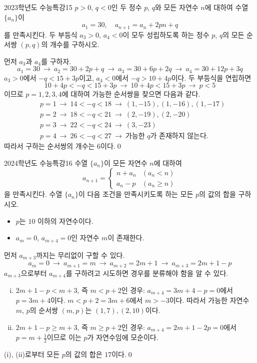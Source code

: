 \documentclass{article}
\begin{document}
\newpage
\begin{prob}{2023학년도 수능특강}{15}
	$p>0$, $q<0$인 두 정수 $p$, $q$와 모든 자연수 $n$에 대하여 수열 $\{a_n\}$이
	\[
		a_1=30,\quad a_{n+1}=a_n+2pn+q
	\]
	를 만족시킨다. 두 부등식 $a_3>0$, $a_4<0$이 모두 성립하도록 하는 정수 $p$, $q$의 모든 순서쌍 $(p,q)$의 개수를 구하시오.
\end{prob}

\begin{sol}
	먼저 $a_3$과 $a_4$를 구하자.
	\[
		a_1=30~\longrightarrow~a_2=30+2p+q~\longrightarrow~a_3=30+6p+2q~\longrightarrow~a_4=30+12p+3q
	\]
	$a_3>0$에서 $-q<15+3p$이고, $a_4<0$에서 $-q>10+4p$이다. 두 부등식을 연립하면
	\[
		10+4p<-q<15+3p~\longrightarrow~10+4p<15+3p~\longrightarrow~p<5
	\]
	이므로 $p=1,2,3,4$에 대하여 가능한 순서쌍을 찾으면 다음과 같다.
	\begin{align*}
		&p=1~\longrightarrow~14<-q<18~\longrightarrow~(1,-15),(1,-16),(1,-17)\\
		&p=2~\longrightarrow~18<-q<21~\longrightarrow~(2,-19),(2,-20)\\
		&p=3~\longrightarrow~22<-q<24~\longrightarrow~(3,-23)\\
		&p=4~\longrightarrow~26<-q<27~\longrightarrow~\text{가능한 }q\text{가 존재하지 않는다.}
	\end{align*}
	따라서 구하는 순서쌍의 개수는 $6$이다.\qed
\end{sol}

\newpage
\begin{prob}{2024학년도 수능특강}{16}
	수열 $\{a_n\}$이 모든 자연수 $n$에 대하여
	\[
		a_{n+1}=\begin{cases}
			n+a_n & (a_n<n) \\
			a_n-p & (a_n\geq n)
		\end{cases}
	\]
	을 만족시킨다. 수열 $\{a_n\}$이 다음 조건을 만족시키도록 하는 모든 $p$의 값의 합을 구하시오.
	\begin{hint}
		\begin{itemize}
			\item[(가)] $p$는 $10$ 이하의 자연수이다.
			\item[(나)] $a_m=0$, $a_{m+4}=0$인 자연수 $m$이 존재한다.
		\end{itemize}
	\end{hint}
\end{prob}

\begin{sol}
	먼저 $a_{m+3}$까지는 무리없이 구할 수 있다.
	\[
		a_m=0~\longrightarrow~a_{m+1}=m~\longrightarrow~a_{m+2}=2m+1~\longrightarrow~a_{m+3}=2m+1-p
	\]
	$a_{m+3}$으로부터 $a_{m+4}$를 구하려고 시도하면 경우를 분류해야 함을 알 수 있다.
	\begin{enumerate}[(i)]
		\item $2m+1-p<m+3$, 즉 $m<p+2$인 경우: $a_{m+4}=3m+4-p=0$에서 $p=3m+4$이다. $m<p+2=3m+6$에서 $m>-3$이다. 따라서 가능한 자연수 $m$, $p$의 순서쌍 $(m,p)$는 $(1,7),(2,10)$이다.
		\item $2m+1-p\geq m+3$, 즉 $m\geq p+2$인 경우: $a_{m+4}=2m+1-2p=0$에서 $p=m+\frac{1}{2}$이므로 이는 $p$가 자연수임에 모순이다.
	\end{enumerate}
	(i), (ii)로부터 모든 $p$의 값의 합은 $17$이다.\qed
\end{sol}
\end{document}
